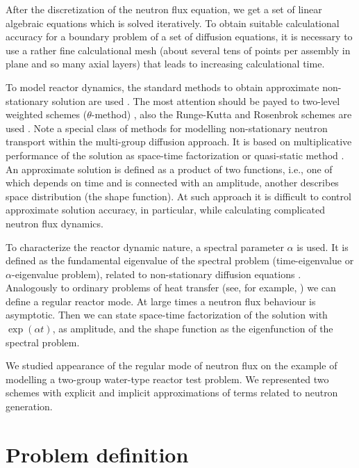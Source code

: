 \documentclass{llncs}
\begin{document}
After the discretization of the neutron flux equation, we get a set of linear algebraic equations which is solved iteratively. To obtain suitable calculational accuracy for a boundary problem of a set of diffusion equations, it is necessary to use a rather fine calculational mesh (about several tens of points per assembly in plane and so many axial layers) that leads to increasing calculational time.

To model reactor dynamics, the standard methods to obtain approximate non-stationary solution are used \cite{sutton1996diffusion,stacey}. The most attention should be payed to two-level weighted schemes ($\theta$-method) \cite{Ascher2008}, also the Runge-Kutta and Rosenbrok schemes are used \cite{HairerWanner2010}. Note a special class of methods for modelling non-stationary neutron transport within the multi-group diffusion approach.
It is based on multiplicative performance of the solution as space-time factorization or quasi-static method \cite{goluoglu2001time}. An approximate solution is defined as a product of two functions, i.e., one of which depends on time and is connected with an amplitude,
another describes space distribution (the shape function). At such approach it is difficult to control approximate solution accuracy, in particular, while calculating complicated neutron flux dynamics.

To characterize the reactor dynamic nature, a spectral parameter $\alpha$ is used.
It is defined as the fundamental eigenvalue of the spectral problem (time-eigenvalue or $\alpha$-eigenvalue problem), related to non-stationary diffusion equations 
\cite{Bell1970,verdu20103d}. Analogously to ordinary problems of heat transfer (see, for example, \cite{luikov2012analytical}) we can define a regular reactor mode.
At large times a neutron flux behaviour is asymptotic. Then we can state space-time factorization of the solution with $\exp(\alpha t)$, as amplitude, and the shape function as the eigenfunction of the spectral problem. 

We studied appearance of the regular mode of neutron flux on the example of modelling a two-group water-type reactor test problem. We represented two schemes with explicit and implicit approximations of terms related to neutron generation.
 
 
\section{Problem definition}
\end{document}
